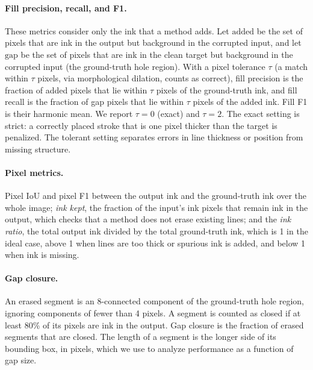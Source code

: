 \documentclass[preprint,12pt]{elsarticle}
\begin{document}
\paragraph{Fill precision, recall, and F1.} These metrics consider only the ink that
a method adds. Let $\text{added}$ be the set of pixels that are ink in the output but
background in the corrupted input, and let $\text{gap}$ be the set of pixels that are
ink in the clean target but background in the corrupted input (the ground-truth hole
region). With a pixel tolerance $\tau$ (a match within $\tau$ pixels, via
morphological dilation, counts as correct), fill precision is the fraction of added
pixels that lie within $\tau$ pixels of the ground-truth ink, and fill recall is the
fraction of gap pixels that lie within $\tau$ pixels of the added ink. Fill F1 is
their harmonic mean. We report $\tau = 0$ (exact) and $\tau = 2$. The exact setting
is strict: a correctly placed stroke that is one pixel thicker than the target is
penalized. The tolerant setting separates errors in line thickness or position from
missing structure.

\paragraph{Pixel metrics.} Pixel IoU and pixel F1 between the output ink and the
ground-truth ink over the whole image; \emph{ink kept}, the fraction of the input's
ink pixels that remain ink in the output, which checks that a method does not erase
existing lines; and the \emph{ink ratio}, the total output ink divided by the total
ground-truth ink, which is 1 in the ideal case, above 1 when lines are too thick or
spurious ink is added, and below 1 when ink is missing.

\paragraph{Gap closure.} An erased segment is an 8-connected component of the
ground-truth hole region, ignoring components of fewer than 4 pixels. A segment is
counted as closed if at least 80\% of its pixels are ink in the output. Gap closure is
the fraction of erased segments that are closed. The length of a segment is the
longer side of its bounding box, in pixels, which we use to analyze performance as a
function of gap size.
\end{document}
